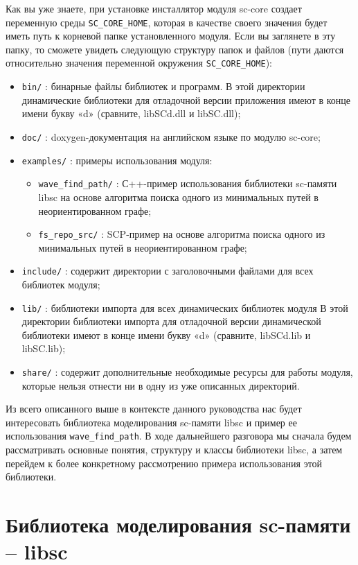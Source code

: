 Как вы уже знаете, при установке инсталлятор модуля sc-core создает
переменную среды \verb+SC_CORE_HOME+, которая в качестве своего значения
будет иметь путь к корневой папке установленного модуля. Если вы
заглянете в эту папку, то сможете увидеть следующую структуру папок и
файлов (пути даются относительно значения переменной окружения
\verb+SC_CORE_HOME+):
\begin{itemize}
\item \verb|bin/| : бинарные файлы библиотек и программ. В этой директории
  динамические библиотеки для отладочной версии приложения имеют в
  конце имени букву «d» (сравните, libSCd.dll и libSC.dll);
\item \verb|doc/| : doxygen-документация на английском языке по модулю sc-core;
\item \verb|examples/| : примеры использования модуля:
  \begin{itemize}
  \item \verb|wave_find_path/| : С++-пример использования библиотеки
    sc-памяти libsc на основе алгоритма поиска одного из минимальных
    путей в неориентированном графе;
  \item \verb|fs_repo_src/| : SCP-пример на основе алгоритма поиска одного из
    минимальных путей в неориентированном графе;
  \end{itemize}
\item \verb|include/| : содержит директории с заголовочными файлами
  для всех библиотек модуля;
\item \verb|lib/| : библиотеки импорта для всех динамических библиотек модуля
  В этой директории библиотеки импорта для отладочной версии
  динамической библиотеки имеют в конце имени букву «d» (сравните,
  libSCd.lib и libSC.lib);
\item \verb|share/| : содержит дополнительные необходимые ресурсы для работы
  модуля, которые нельзя отнести ни в одну из уже описанных
  директорий.
\end{itemize}

Из всего описанного выше в контексте данного руководства нас будет
интересовать библиотека моделирования sc-памяти libsc и пример ее
использования \verb|wave_find_path|. В ходе дальнейшего разговора мы сначала
будем рассматривать основные понятия, структуру и классы библиотеки
libsc, а затем перейдем к более конкретному рассмотрению примера
использования этой библиотеки.

\section{Библиотека моделирования sc-памяти – libsc}

